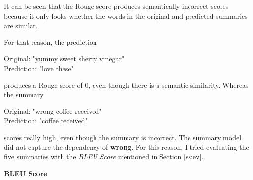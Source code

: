 It can be seen that the Rouge score produces semantically incorrect scores because it only looks whether the words in the original and predicted summaries are similar. 

For that reason, the prediction 

\begin{tcolorbox}
	Original: "yummy sweet sherry vinegar" \\
	Prediction: "love these"
\end{tcolorbox}

produces a Rouge score of 0, even though there is a semantic similarity. Whereas the summary

\begin{tcolorbox}
	Original: "wrong coffee received" \\
	Prediction: "coffee received"
\end{tcolorbox}

scores really high, even though the summary is incorrect. The summary model did not capture the dependency of \textbf{wrong}. For this reason, I tried evaluating the five summaries with the \textit{BLEU Score} mentioned in Section \ref{ss:ev}.

\textbf{BLEU Score}


